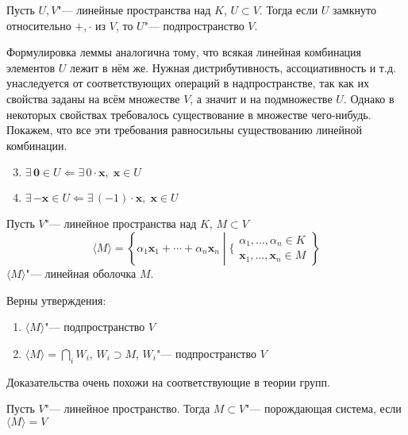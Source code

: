 \documentclass[12pt]{../../../notes}
\begin{document}
\begin{lem}\label{lem:linspsign}
  Пусть $U,V$"--- линейные пространства над $K$, $U \subset V$. Тогда если $U$ замкнуто относительно
  $+, \cdot$  из  $V$, то  $U$"--- подпространство
  $V$.
\end{lem}
\begin{itlproof}
  Формулировка леммы аналогична тому, что всякая линейная комбинация элементов $U$ лежит в нём же.
  Нужная дистрибутивность, ассоциативность и т.д. унаследуется от соответствующих операций в 
  надпространстве, так как их свойства заданы на всём множестве $V$, а значит и на подмножестве $U$.
  Однако в некоторых свойствах требовалось существование в множестве чего-нибудь.
  Покажем, что все эти требования равносильны существованию линейной комбинации.
  \begin{enumerate}
      \setcounter{enumi}{2}
    \item $\exists\, \mathbf{0}\in U \Leftarrow \exists\, 0\cdot \mathbf{x},\; \mathbf{x}\in U$
    \item $\exists\, \mathbf{-x}\in U \Leftarrow \exists\, (-1)\cdot \mathbf{x},\; \mathbf{x}\in U$
  \end{enumerate}
\end{itlproof}

{ \label{defn:linshell}
Пусть $V$"--- линейное пространства над $K$, $M \subset V$
\[
  \langle M \rangle = 
  \left\{ \alpha_1 \mathbf{x}_1 + \dotsb + \alpha_n \mathbf{x}_n \middle|
  \Big\{ \begin{array}{l}
    \alpha_1, \dotsc, \alpha_n \in K\\
    \mathbf{x}_1, \dotsc, \mathbf{x}_n \in M
  \end{array} \right\}
\] 
$\langle M \rangle$"--- линейная оболочка $M$.
}

\begin{lem}\label{lem:linspan}
  Верны утверждения:
  \begin{enumerate}
    \item $\langle M \rangle$"--- подпространство $V$
    \item $ \langle M \rangle = \bigcap\limits_i W_i$, $W_i \supset M$, $W_i$"--- подпространство $V$
  \end{enumerate}
\end{lem}
\begin{itlproof}
  Доказательства очень похожи на соответствующие в теории групп.
\end{itlproof}

\begin{defn}\label{defn:linspanprop}
  Пусть $V$"--- линейное пространство. Тогда
  $M \subset V$"--- порождающая система, если $\langle M\rangle = V$
\end{defn}
\end{document}
